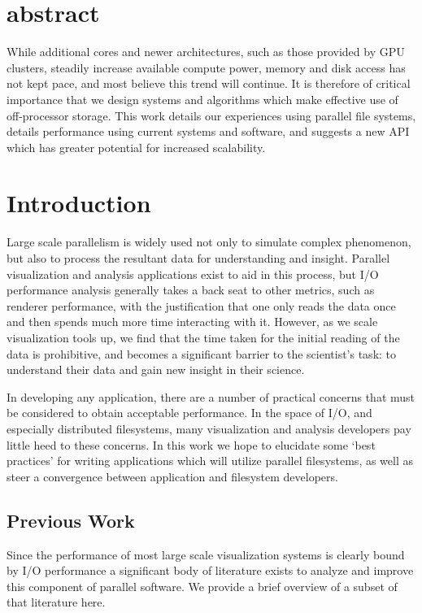 \section{abstract}

While additional cores and newer architectures, such as those provided
by GPU clusters, steadily increase available compute power, memory
and disk access has not kept pace, and most believe this trend will
continue.  It is therefore of critical importance that we design
systems and algorithms which make effective use of off-processor
storage.  This work details our experiences using parallel file
systems, details performance using current systems and software,
and suggests a new API which has greater potential for increased
scalability.

\section{Introduction}

Large scale parallelism is widely used not only to simulate complex
phenomenon, but also to process the resultant data for understanding
and insight.  Parallel visualization and analysis applications exist
to aid in this process, but I/O performance analysis generally takes
a back seat to other metrics, such as renderer performance, with the
justification that one only reads the data once and then spends much
more time interacting with it.  However, as we scale visualization
tools up, we find that the time taken for the initial reading of
the data is prohibitive, and becomes a significant barrier to the
scientist's task: to understand their data and gain new insight in
their science.

In developing any application, there are a number of practical
concerns that must be considered to obtain acceptable performance.
In the space of I/O, and especially distributed filesystems, many
visualization and analysis developers pay little heed to these
concerns.  In this work we hope to elucidate some `best practices' for
writing applications which will utilize parallel filesystems, as well
as steer a convergence between application and filesystem developers.

\subsection{Previous Work}

Since the performance of most large scale visualization systems is
clearly bound by I/O performance a significant body of literature
exists to analyze and improve this component of parallel software.  We
provide a brief overview of a subset of that literature here.

